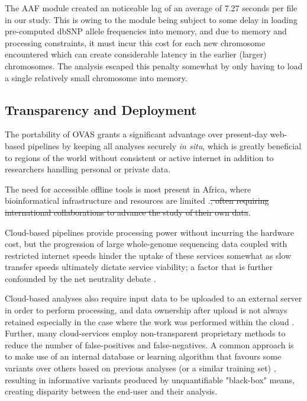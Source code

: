 \documentclass[twocolumn]{bmcart}%
\def\app{OVAS}
\newcommand{\horia}[1]{{\color{magenta} #1}}
\newcommand{\horiaremove}[1]{{\color{magenta}\st{#1}}}
\newcounter{changeCount}
\newcommand{\changes}[1]{
		\stepcounter{changeCount}
		{\tiny\bf\color{violet}\arabic{changeCount}}
		{\color{red} #1}
	}
\newcommand{\horia}[1]{#1}
\newcommand{\horiaremove}[1]{}  %
\newcommand{\changes}[1]{#1}
\begin{document}
The AAF module created an noticeable lag of an average of 7.27 seconds per file in our study. This is owing to the module being subject to some delay in loading pre-computed dbSNP allele frequencies into memory, and due to memory and processing constraints, it must incur this cost for each new chromosome encountered which can create considerable latency in the earlier (larger) chromosomes. The analysis escaped this penalty somewhat by only having to load a single relatively small chromosome into memory.



\subsection{Transparency and Deployment}

The portability of \app{} grants a significant advantage over present-day web-based pipelines by keeping all analyses securely \textit{in situ}, which is greatly beneficial to regions of the world without consistent or active internet in addition to researchers handling personal or private data. \changes{The need for accessible offline tools is most present in Africa, where bioinformatical infrastructure and resources are limited\horia{.}\horiaremove{, often requiring international collaborations to advance the study of their own data}\cite{h3africa2014enabling}.

Cloud-based pipelines provide processing power without incurring the hardware cost, but the progression of large whole-genome sequencing data coupled with restricted internet speeds hinder the uptake of these services somewhat as slow transfer speeds ultimately dictate service viability; a factor that is further confounded by the net neutrality debate \cite{netneutrality}.} Cloud-based analyses also require input data to be uploaded to an external server in order to perform processing, and data ownership after upload is not always retained especially in the case where the work was performed within the cloud \cite{reed2010information}. Further, many cloud-services employ non-transparent proprietary methods to reduce the number of false-positives and false-negatives. A common approach is to make use of an internal database or learning algorithm that favours some variants over others based on previous analyses (or a similar training set) \cite{pabinger2014survey}, resulting in informative variants produced by unquantifiable "black-box" means, creating disparity between the end-user and their analysis.
\end{document}
